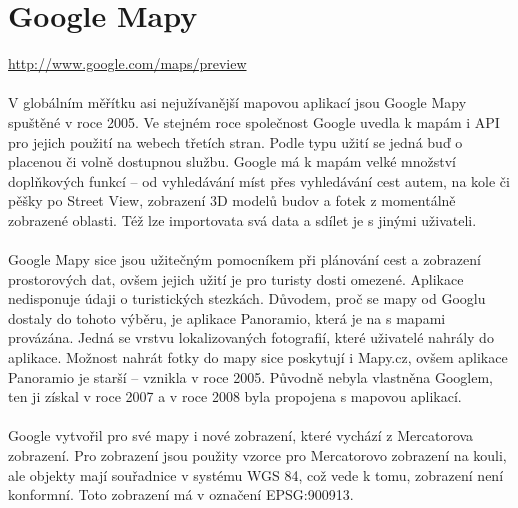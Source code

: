 \documentclass[11pt,a4paper,titlepage,oneside]{book}
\begin{document}
	\section{Google Mapy}
		\url{http://www.google.com/maps/preview}
		\paragraph{} V globálním měřítku asi nejužívanější mapovou aplikací jsou Google Mapy spuštěné v roce 2005. Ve stejném roce společnost Google uvedla k mapám i API pro jejich použití na webech třetích stran. Podle typu užití se jedná buď o placenou či volně dostupnou službu. Google má k mapám velké množství doplňkových funkcí -- od vyhledávání míst přes vyhledávání cest autem, na kole či pěšky po Street View, zobrazení 3D modelů budov a fotek z momentálně zobrazené oblasti. Též lze importovata svá data a sdílet je s jinými uživateli.
		\paragraph{} Google Mapy sice jsou užitečným pomocníkem při plánování cest a zobrazení prostorových dat, ovšem jejich užití je pro turisty dosti omezené. Aplikace nedisponuje údaji o turistických stezkách. Důvodem, proč se mapy od Googlu dostaly do tohoto výběru, je aplikace Panoramio, která je na s mapami provázána. Jedná se vrstvu lokalizovaných fotografií, které uživatelé nahrály do aplikace. Možnost nahrát fotky do mapy sice poskytují i  Mapy.cz, ovšem aplikace Panoramio je starší -- vznikla v roce 2005. Původně nebyla vlastněna Googlem, ten ji získal v roce 2007 a v roce 2008 byla propojena s  mapovou aplikací. 
		\paragraph{}  Google vytvořil pro své mapy i nové zobrazení, které vychází z Mercatorova zobrazení. Pro zobrazení jsou použity vzorce pro Mercatorovo zobrazení na kouli, ale objekty mají  souřadnice v systému WGS 84, což vede k tomu, zobrazení není konformní.\label{google_mercator} Toto zobrazení má v označení EPSG:900913.
\end{document}
